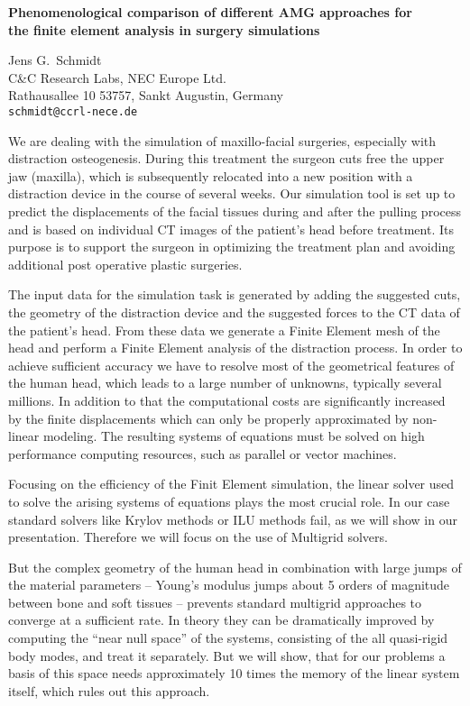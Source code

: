 \documentclass[twosided]{report}
\begin{document}
\begin{center}
{\large			%
{\bf Phenomenological comparison of different AMG approaches for \\
	the finite element analysis in surgery simulations}}

	Jens G.~Schmidt \\
	C\&C Research Labs, NEC Europe Ltd. \\
	Rathausallee 10 53757, Sankt Augustin, Germany \\
	{\tt schmidt@ccrl-nece.de}
\end{center}
We are dealing with the simulation of maxillo-facial
surgeries, especially with distraction osteogenesis. During
this treatment the surgeon cuts free the upper jaw
(maxilla), which is subsequently relocated into a new
position with a distraction device in the course of several
weeks. Our simulation tool is set up to predict the
displacements of the facial tissues during and after the
pulling process and is based on individual CT images of the
patient's head before treatment. Its purpose is to support
the surgeon in optimizing the treatment plan and avoiding
additional post operative plastic surgeries.

The input
data for the simulation task is generated by adding the
suggested cuts, the geometry of the distraction device and
the suggested forces to the CT data of the patient's head.
From these data we generate a Finite Element mesh of the
head and perform a Finite Element analysis of the
distraction process. In order to achieve sufficient accuracy
we have to resolve most of the geometrical features of the
human head, which leads to a large number of unknowns,
typically several millions. In addition to that the
computational costs are significantly increased by the
finite displacements which can only be properly approximated
by non-linear modeling. The resulting systems of equations
must be solved on high performance computing resources, such
as parallel or vector machines.

Focusing on the
efficiency of the Finit Element simulation, the linear
solver used to solve the arising systems of equations plays
the most crucial role. In our case standard solvers like
Krylov methods or ILU methods fail, as we will show in our
presentation. Therefore we will focus on the use of
Multigrid solvers.

But the complex geometry of the human
head in combination with large jumps of the material
parameters -- Young's modulus jumps about 5 orders of
magnitude between bone and soft tissues -- prevents standard
multigrid approaches to converge at a sufficient rate. In
theory they can be dramatically improved by computing the
``near null space'' of the systems, consisting of the all
quasi-rigid body modes, and treat it separately. But we will
show, that for our problems a basis of this space needs
approximately 10 times the memory of the linear system
itself, which rules out this approach.
\end{document}
